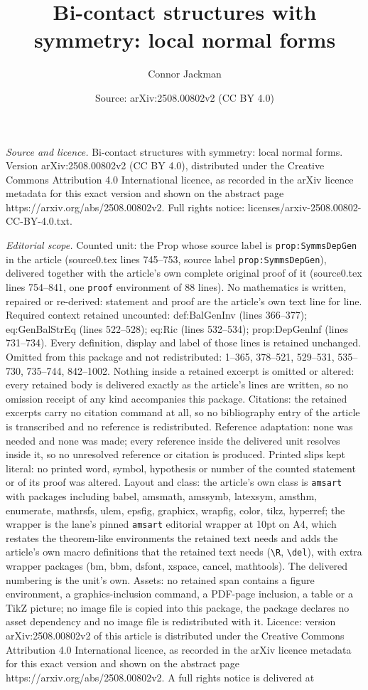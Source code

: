 \documentclass[10pt,a4paper]{amsart}
\title[Bi-contact structures with symmetry: local normal forms]{Bi-contact structures with symmetry: local normal forms}
\author{Connor Jackman}
\date{Source: arXiv:2508.00802v2 (CC BY 4.0)}
\begin{document}
\maketitle

\noindent\emph{Source and licence.} Bi-contact structures with symmetry: local normal forms. Version arXiv:2508.00802v2 (CC BY 4.0), distributed under the Creative Commons Attribution 4.0 International licence, as recorded in the arXiv licence metadata for this exact version and shown on the abstract page https://arxiv.org/abs/2508.00802v2. Full rights notice: licenses/arxiv-2508.00802-CC-BY-4.0.txt.\par\smallskip

\noindent\textit{Editorial scope.} Counted unit: the Prop whose source label is \texttt{prop:SymmsDepGen} in the article (source0.tex lines 745--753, source label \texttt{prop:SymmsDepGen}), delivered together with the article's own complete original proof of it (source0.tex lines 754--841, one \texttt{proof} environment of 88 lines). No mathematics is written, repaired or re-derived: statement and proof are the article's own text line for line. Required context retained uncounted: def:BalGenInv (lines 366--377); eq:GenBalStrEq (lines 522--528); eq:Ric (lines 532--534); prop:DepGenlnf (lines 731--734). Every definition, display and label of those lines is retained unchanged. Omitted from this package and not redistributed: 1--365, 378--521, 529--531, 535--730, 735--744, 842--1002. Nothing inside a retained excerpt is omitted or altered: every retained body is delivered exactly as the article's lines are written, so no omission receipt of any kind accompanies this package. Citations: the retained excerpts carry no citation command at all, so no bibliography entry of the article is transcribed and no reference is redistributed. Reference adaptation: none was needed and none was made; every reference inside the delivered unit resolves inside it, so no unresolved reference or citation is produced. Printed slips kept literal: no printed word, symbol, hypothesis or number of the counted statement or of its proof was altered. Layout and class: the article's own class is \texttt{amsart} with packages including babel, amsmath, amssymb, latexsym, amsthm, enumerate, mathrsfs, ulem, epsfig, graphicx, wrapfig, color, tikz, hyperref; the wrapper is the lane's pinned \texttt{amsart} editorial wrapper at 10pt on A4, which restates the theorem-like environments the retained text needs and adds the article's own macro definitions that the retained text needs (\texttt{\textbackslash R}, \texttt{\textbackslash del}), with extra wrapper packages (bm, bbm, dsfont, xspace, cancel, mathtools). The delivered numbering is the unit's own. Assets: no retained span contains a figure environment, a graphics-inclusion command, a PDF-page inclusion, a table or a TikZ picture; no image file is copied into this package, the package declares no asset dependency and no image file is redistributed with it. Licence: version arXiv:2508.00802v2 of this article is distributed under the Creative Commons Attribution 4.0 International licence, as recorded in the arXiv licence metadata for this exact version and shown on the abstract page https://arxiv.org/abs/2508.00802v2. A full rights notice is delivered at 
\end{document}
